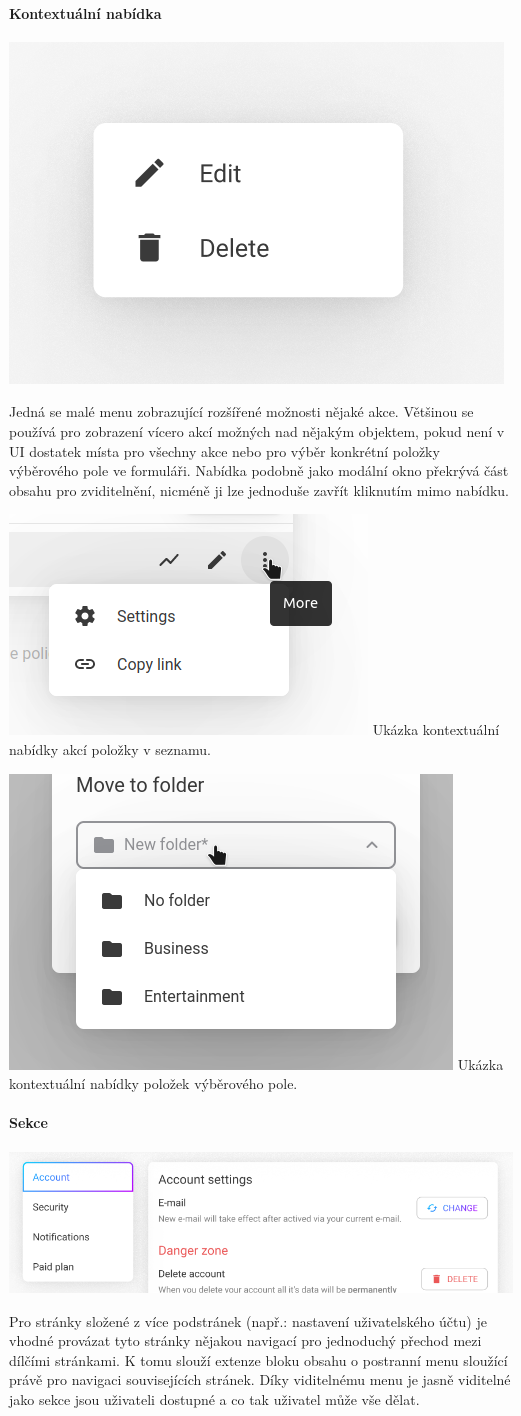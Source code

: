 \begin{itemize}
\begin{itemize}
			\paragraph{Kontextuální nabídka}

			\includegraphics[width=0.24\linewidth]{obrazky/kontextualni_nabidka.png}\hfill

			Jedná se malé menu zobrazující rozšířené možnosti nějaké akce.
			Většinou se používá pro zobrazení vícero akcí možných nad nějakým objektem, pokud není v \ac{UI} dostatek
			místa pro všechny akce nebo pro výběr konkrétní položky výběrového pole ve formuláři.
			Nabídka podobně jako modální okno překrývá část obsahu pro zviditelnění, nicméně ji lze jednoduše zavřít
			kliknutím mimo nabídku.

			\includegraphics[width=0.24\linewidth]{obrazky/kontextualni_nabidka_seznam_ukazka.png}\hfill
			Ukázka kontextuální nabídky akcí položky v seznamu. %

			\includegraphics[width=0.24\linewidth]{obrazky/kontextualni_nabidka_vyberove_pole_ukazka.png}\hfill
			Ukázka kontextuální nabídky položek výběrového pole. %

			\paragraph{Sekce}

			\includegraphics[width=0.24\linewidth]{obrazky/sekce.png}\hfill

			Pro stránky složené z více podstránek (např.: nastavení uživatelského účtu) je vhodné provázat tyto stránky
			nějakou navigací pro jednoduchý přechod mezi dílčími stránkami.
			K tomu slouží extenze bloku obsahu o postranní menu sloužící právě pro navigaci souvisejících stránek.
			Díky viditelnému menu je jasně viditelné jako sekce jsou uživateli dostupné a co tak uživatel může vše dělat.


\end{itemize}
\end{itemize}
